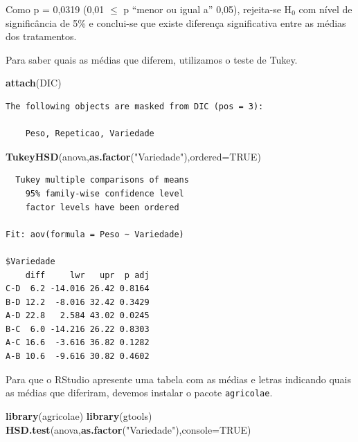 \documentclass[12pt,brazil,oneside]{book}
\newenvironment{Shaded}{\begin{snugshade}}{\end{snugshade}}
\newcommand{\DataTypeTok}[1]{\textcolor[rgb]{0.13,0.29,0.53}{#1}}
\newcommand{\KeywordTok}[1]{\textcolor[rgb]{0.13,0.29,0.53}{\textbf{#1}}}
\newcommand{\NormalTok}[1]{#1}
\newcommand{\OtherTok}[1]{\textcolor[rgb]{0.56,0.35,0.01}{#1}}
\newcommand{\StringTok}[1]{\textcolor[rgb]{0.31,0.60,0.02}{#1}}
\begin{document}
Como p = 0,0319 (0,01 \(\leq\) p ``menor ou igual a'' 0,05), rejeita-se H\(_0\) com nível de significância de 5\% e conclui-se que existe diferença significativa entre as médias dos tratamentos.

Para saber quais as médias que diferem, utilizamos o teste de Tukey.

\begin{Shaded}
\begin{Highlighting}[]
\KeywordTok{attach}\NormalTok{(DIC)}
\end{Highlighting}
\end{Shaded}

\begin{verbatim}
The following objects are masked from DIC (pos = 3):

    Peso, Repeticao, Variedade
\end{verbatim}

\begin{Shaded}
\begin{Highlighting}[]
\KeywordTok{TukeyHSD}\NormalTok{(anova,}\KeywordTok{as.factor}\NormalTok{(}\StringTok{"Variedade"}\NormalTok{),}\DataTypeTok{ordered=}\OtherTok{TRUE}\NormalTok{)}
\end{Highlighting}
\end{Shaded}

\begin{verbatim}
  Tukey multiple comparisons of means
    95% family-wise confidence level
    factor levels have been ordered

Fit: aov(formula = Peso ~ Variedade)

$Variedade
    diff     lwr   upr  p adj
C-D  6.2 -14.016 26.42 0.8164
B-D 12.2  -8.016 32.42 0.3429
A-D 22.8   2.584 43.02 0.0245
B-C  6.0 -14.216 26.22 0.8303
A-C 16.6  -3.616 36.82 0.1282
A-B 10.6  -9.616 30.82 0.4602
\end{verbatim}

Para que o RStudio apresente uma tabela com as médias e letras indicando quais as médias que diferiram, devemos instalar o pacote \texttt{agricolae}.

\begin{Shaded}
\begin{Highlighting}[]
\KeywordTok{library}\NormalTok{(agricolae)}
\KeywordTok{library}\NormalTok{(gtools)}
\KeywordTok{HSD.test}\NormalTok{(anova,}\KeywordTok{as.factor}\NormalTok{(}\StringTok{"Variedade"}\NormalTok{),}\DataTypeTok{console=}\OtherTok{TRUE}\NormalTok{)}
\end{Highlighting}
\end{Shaded}
\end{document}
